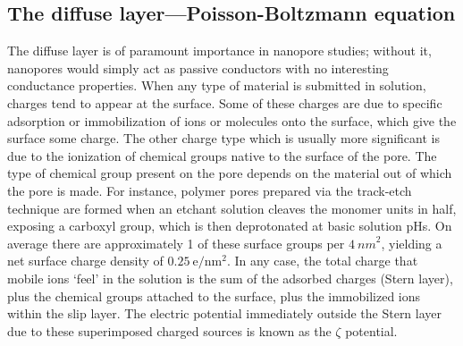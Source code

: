 			
			
			
		\subsection{The diffuse layer---Poisson-Boltzmann equation}
			
			The diffuse layer is of paramount importance in nanopore studies; without it, nanopores would simply act as passive conductors with no interesting conductance properties. When any type of material is submitted in solution, charges tend to appear at the surface. Some of these charges are due to specific adsorption or immobilization of ions or molecules onto the surface, which give the surface some charge. The other charge type which is usually more significant is due to the ionization of chemical groups native to the surface of the pore. The type of chemical group present on the pore depends on the material out of which the pore is made. For instance, polymer pores prepared via the track-etch technique are formed when an etchant solution cleaves the monomer units in half, exposing a carboxyl group, which is then deprotonated at basic solution pHs. On average there are approximately 1 of these surface groups per $\SI{4}{nm}^{2}$, yielding a net surface charge density of $0.25~\mathrm{e}/\mathrm{nm}^{2}$. In any case, the total charge that mobile ions `feel' in the solution is the sum of the adsorbed charges (Stern layer), plus the chemical groups attached to the surface, plus the immobilized ions within the slip layer. The electric potential immediately outside the Stern layer due to these superimposed charged sources is known as the $\zeta$ potential.
			
			
			
